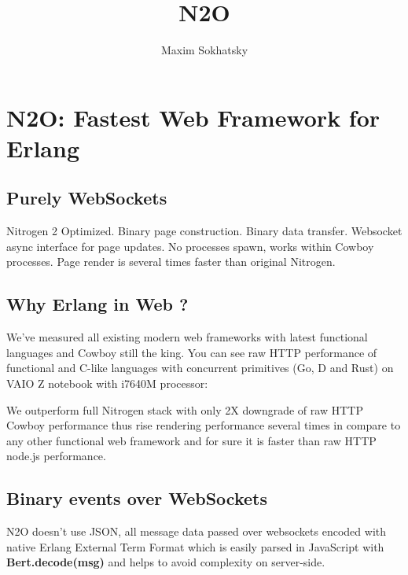 \documentclass[11pt]{article}
\begin{document}
\title{N2O}
\author{Maxim Sokhatsky}

\paragraph{}
\section*{N2O: Fastest Web Framework for Erlang}

\subsection*{Purely WebSockets}
Nitrogen 2 Optimized. Binary page construction.
Binary data transfer. Websocket async interface for
page updates. No processes spawn, works within
Cowboy processes. Page render is several times faster than
original Nitrogen. 

\subsection*{Why Erlang in Web ?}
We've measured all existing modern web frameworks with latest functional languages and Cowboy still the king.
You can see raw HTTP performance of functional and C-like languages with concurrent primitives (Go, D and Rust)
on VAIO Z notebook with i7640M processor:


We outperform full Nitrogen stack with only 2X downgrade of raw HTTP Cowboy
performance thus rise rendering performance several times in compare to
any other functional web framework and for sure it is faster than raw HTTP node.js performance.

\subsection*{Binary events over WebSockets}
N2O doesn't use JSON, all message data passed over websockets encoded with
native Erlang External Term Format which is easily parsed in JavaScript
with {\bf Bert.decode(msg)} and helps to avoid complexity on server-side.
\end{document}
